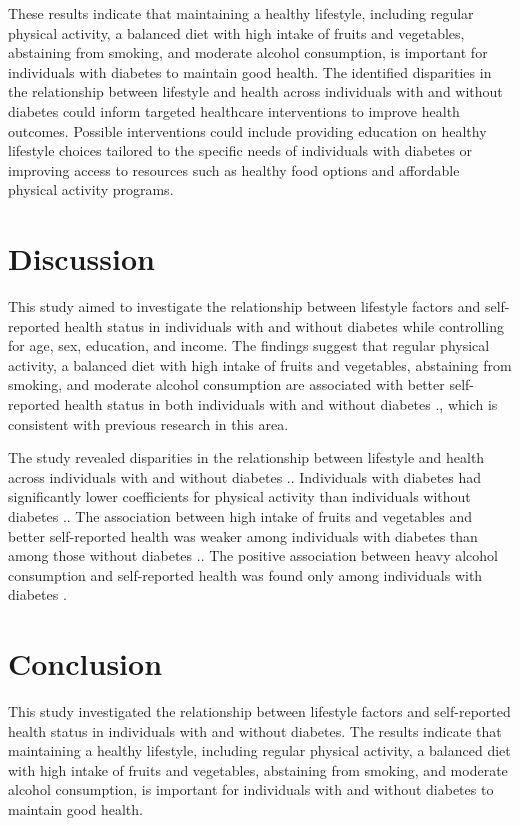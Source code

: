 \documentclass[12pt]{article}
\begin{document}
These results indicate that maintaining a healthy lifestyle, including regular physical activity, a balanced diet with high intake of fruits and vegetables, abstaining from smoking, and moderate alcohol consumption, is important for individuals with diabetes to maintain good health. The identified disparities in the relationship between lifestyle and health across individuals with and without diabetes could inform targeted healthcare interventions to improve health outcomes. Possible interventions could include providing education on healthy lifestyle choices tailored to the specific needs of individuals with diabetes or improving access to resources such as healthy food options and affordable physical activity programs.

\section{Discussion}

This study aimed to investigate the relationship between lifestyle factors and self-reported health status in individuals with and without diabetes while controlling for age, sex, education, and income. The findings suggest that regular physical activity, a balanced diet with high intake of fruits and vegetables, abstaining from smoking, and moderate alcohol consumption are associated with better self-reported health status in both individuals with and without diabetes \cite{Whiting2022Variations, Soares2018Association, Halliday2016Earnings}., which is consistent with previous research in this area.

The study revealed disparities in the relationship between lifestyle and health across individuals with and without diabetes \cite{Gorber2009The}.. Individuals with diabetes had significantly lower coefficients for physical activity than individuals without diabetes \cite{Jack2005Beyond}.. The association between high intake of fruits and vegetables and better self-reported health was weaker among individuals with diabetes than among those without diabetes \cite{Shiue2015Age}.. The positive association between heavy alcohol consumption and self-reported health was found only among individuals with diabetes \cite{Grandy2008EQ-5D}.

\section{Conclusion}

This study investigated the relationship between lifestyle factors and self-reported health status in individuals with and without diabetes. The results indicate that maintaining a healthy lifestyle, including regular physical activity, a balanced diet with high intake of fruits and vegetables, abstaining from smoking, and moderate alcohol consumption, is important for individuals with and without diabetes to maintain good health.
\end{document}
